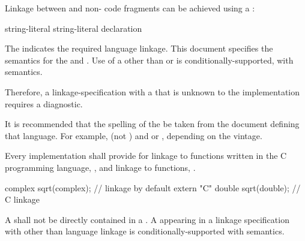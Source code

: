 \pnum
Linkage between \Cpp{} and  non-\Cpp{} code fragments can
be achieved using a :

%
%
%
\begin{bnf}
\br
     string-literal \terminal{\{}  \terminal{\}}\br
     string-literal declaration
\end{bnf}

The  indicates the required language linkage.
This document specifies the semantics for the
  and . Use of a
 other than  or  is
conditionally-supported, with  semantics.
\begin{note}
Therefore, a linkage-specification with a  that
is unknown to the implementation requires a diagnostic.
\end{note}
\begin{note}
It is recommended that the spelling of the  be
taken from the document defining that language. For example, 
(not ) and  or , depending on
the vintage.
\end{note}

\pnum
{}%
Every implementation shall provide for linkage to functions written in
the C programming language,
%
, and linkage to \Cpp{} functions, .
\begin{example}
\begin{codeblock}
complex sqrt(complex);          // \Cpp{} linkage by default
extern "C" {
  double sqrt(double);          // C linkage
}
\end{codeblock}
\end{example}

\pnum
A 
shall not be directly contained in
a .
A  appearing in
a linkage specification with other than \Cpp{} language linkage
is conditionally-supported with
 semantics.

